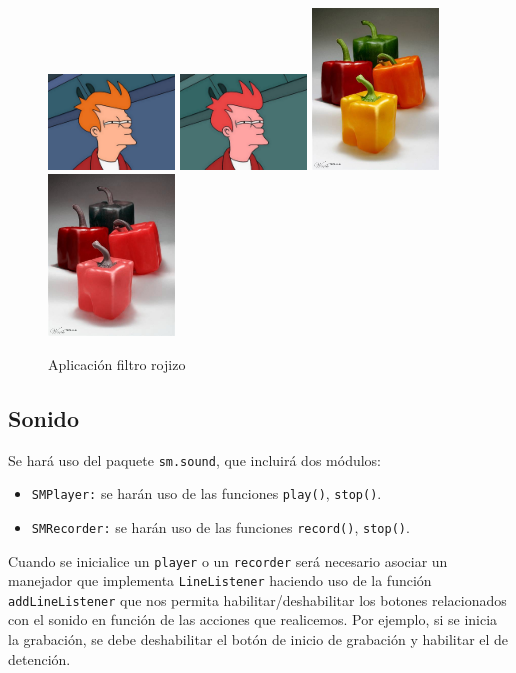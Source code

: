 \begin{figure}[H]
 \centering
 \includegraphics[width=0.3\textwidth]{imagenes/Fry.jpg}
  \includegraphics[width=0.3\textwidth]{imagenes/fryRojido.jpg}
  \vskip0.3cm
  \includegraphics[width=0.3\textwidth]{imagenes/pimientos.jpg}
  \includegraphics[width=0.3\textwidth]{imagenes/pimientoRojizo.jpg}
 \caption{Aplicación filtro rojizo}
 \label{diseño}
 \end{figure}
 
\subsection{Sonido}
Se hará uso del paquete \texttt{sm.sound}, que incluirá dos módulos:
\begin{itemize}
\item{\texttt{SMPlayer:} se harán uso de las funciones \texttt{play()}, \texttt{stop()}.}
\item{\texttt{SMRecorder:} se harán uso de las funciones \texttt{record()}, \texttt{stop()}.}
\end{itemize}
Cuando se inicialice un \texttt{player} o un \texttt{recorder} será necesario asociar un manejador que implementa \texttt{LineListener} haciendo uso de la función \texttt{addLineListener} que nos permita habilitar/deshabilitar los botones relacionados con el sonido en función de las acciones que realicemos. Por ejemplo, si se inicia la grabación, se debe deshabilitar el botón de inicio de grabación y habilitar el de detención.
